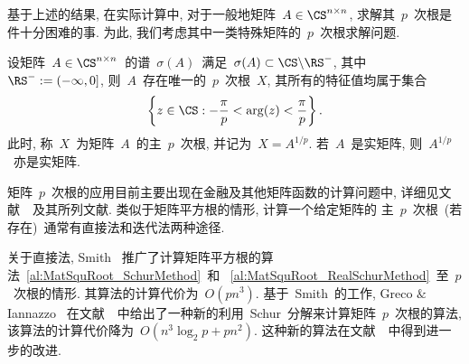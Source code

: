 基于上述的结果, 在实际计算中, 对于一般地矩阵~$A\in\CS^{n\times n}$,
求解其~$p$~次根是件十分困难的事. 为此,
我们考虑其中一类特殊矩阵的~$p$~次根求解问题.

\begin{definition}
\label{th:MatPricipalpthRoot} 设矩阵~$A\in\CS^{n\times
n}$~的谱~$\sigma(A)$~满足~$\sigma(A) \subset \CS\backslash\RS^-$,
其中~$\RS^- := (-\infty,0]$, 则~$A$~存在唯一的~$p$~次根~$X$,
其所有的特征值均属于集合
$$
\left\{z\in \CS: -\frac{\pi}{p} < \arg(z) < \frac{\pi}{p}\right\}.
$$
此时, 称~$X$~为矩阵~$A$~的主~$p$~次根, 并记为~$X = A^{1/p}$.
若~$A$~是实矩阵, 则~$A^{1/p}$~亦是实矩阵.
\end{definition}

矩阵~$p$~次根的应用目前主要出现在金融及其他矩阵函数的计算问题中,
详细见文献~\cite{Higham2008,HighamLin2011,HighamLin2011a,Laszkiewicz2008,HighamAlMohy2010}~及其所列文献.
类似于矩阵平方根的情形, 计算一个给定矩阵的
主~$p$~次根~(若存在)~通常有直接法和迭代法两种途径.

关于直接法, Smith
\cite{Smith2003}~推广了计算矩阵平方根的算法~\ref{al:MatSquRoot_SchurMethod}~和
~\ref{al:MatSquRoot_RealSchurMethod}~至~$p$~次根的情形.
其算法的计算代价为~$O(pn^3)$. 基于~Smith~的工作, Greco $\&$ Iannazzo
~在文献~\cite{GrecoIannazzo2010}~中给出了一种新的利用~Schur~分解来计算矩阵~$p$~次根的算法,
该算法的计算代价降为~$O(n^3\log_2p + pn^2)$.
这种新的算法在文献~\cite{Iannazzo2013}~中得到进一步的改进.

%
%

